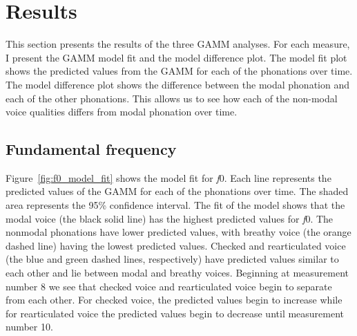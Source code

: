 \section{Results}\label{sec:results_of_lc}

This section presents the results of the three GAMM analyses. For each measure, I present the GAMM model fit and the model difference plot. The model fit plot shows the predicted values from the GAMM for each of the phonations over time. The model difference plot shows the difference between the modal phonation and each of the other phonations. This allows us to see how each of the non-modal voice qualities differs from modal phonation over time.
\subsection{Fundamental frequency} \label{sec:model_f0}

Figure~\ref{fig:f0_model_fit} shows the model fit for \textit{f}0. Each line represents the predicted values of the GAMM for each of the phonations over time. The shaded area represents the 95\% confidence interval. The fit of the model shows that the modal voice (the black solid line) has the highest predicted values for \textit{f}0. The nonmodal phonations have lower predicted values, with breathy voice (the orange dashed line) having the lowest predicted values. Checked and rearticulated voice (the blue and green dashed lines, respectively) have predicted values similar to each other and lie between modal and breathy voices. Beginning at measurement number 8 we see that checked voice and rearticulated voice begin to separate from each other. For checked voice, the predicted values begin to increase while for rearticulated voice the predicted values begin to decrease until measurement number 10.

